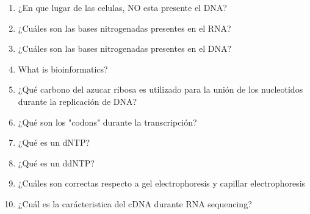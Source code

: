 \documentclass{article}
\begin{document}
\begin{enumerate}
	\item ¿En que lugar de las celulas, NO esta presente el DNA?
	\item  ¿Cuáles son las bases nitrogenadas presentes en el RNA?
	\item ¿Cuáles son las bases nitrogenadas presentes en el DNA?
	\item What is bioinformatics?
	\item ¿Qué carbono del azucar ribosa es utilizado para la unión de los nucleotidos durante la replicación de DNA?
	\item ¿Qué son los "codons" durante la transcripción? 
	\item ¿Qué es un dNTP? 
	\item ¿Qué es un ddNTP? 
	\item ¿Cuáles son correctas respecto a  gel electrophoresis y capillar electrophoresis
	\item ¿Cuál es la carácteristica del cDNA durante RNA sequencing?
	
\end{enumerate}

%
%
\end{document}

